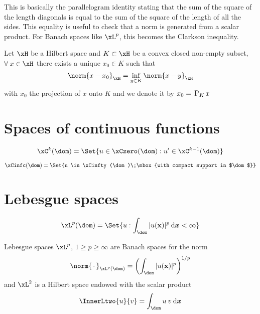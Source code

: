 \begin{rmrk}
This is basically the parallelogram identity stating that the sum of the square of the length diagonals is equal to the sum of the square of the length of all the sides. This equality is useful to check that a norm is generated from a scalar product. For Banach spaces like $\xL^p$, this becomes the Clarkson inequality.
\end{rmrk}

\medskip
\begin{thrm}\label{th:proj_convex}
Let $\xH$ be a Hilbert space and $K \subset \xH$ be a convex closed non-empty subset, $\forany  x \in \xH$ there exists a unique $x_0 \in K$ such that
\begin{equation*}
\norm{x-x_0}_\xH = \inf_{y\in K} \norm{x - y}_\xH
\end{equation*}
with $x_0$ the projection of  $x$ onto $K$ and we denote it by $x_0 = \,\mathrm{P}_{K}\, x$
\end{thrm}


\section{Spaces of continuous functions}

\begin{equation*}
\xC^k(\dom) = \Set{u \in \xCzero(\dom) : u' \in \xC^{k-1}(\dom)}
\end{equation*}

\begin{equation*}
\xCinfc(\dom) = \Set{u \in \xCinfty(\dom)\;\mbox{with compact support in $\dom$}}
\end{equation*}

\section{Lebesgue spaces}

\begin{equation*}
\xL^p(\dom) = \Set{u : \int_\dom |u(\x)|^p \dx < \infty}
\end{equation*}

\begin{rmrk}
Lebesgue spaces $\xL^p$, $1\geq p \geq \infty$ are Banach spaces for the norm
\begin{equation*}
\norm{\xDot}_{\xL^p(\dom)} = \left(\int_\dom |u(\x)|^p\right)^{1/p}
\end{equation*}
and $\xL^2$ is a Hilbert space endowed with the scalar product
\begin{equation}
\InnerLtwo{u}{v} = \int_\dom u\:v\dx
\end{equation}
\end{rmrk}

